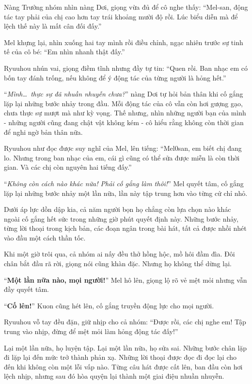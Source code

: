 \documentclass[../main.tex]{subfiles}
\begin{document}
Nàng Trưởng nhóm nhìn nàng Dơi, giọng vừa đủ để cô nghe thấy: ``Mel-san, động tác tay phải của chị cao hơn tay trái khoảng mười độ rồi. Lúc biểu diễn mà để lệch thế này là mất cân đối đấy.''

Mel khựng lại, nhìn xuống hai tay mình rồi điều chỉnh, ngạc nhiên trước sự tinh tế của cô bé: ``Em nhìn nhanh thật đấy.''

Ryuuhou nhún vai, giọng điềm tĩnh nhưng đầy tự tin: ``Quen rồi. Ban nhạc em có bốn tay đánh trống, nếu không để ý động tác của từng người là hỏng hết.''

``\textit{Mình\dots\ thực sự đã nhuần nhuyễn chưa?}'' nàng Dơi tự hỏi bản thân khi cố gắng lặp lại những bước nhảy trong đầu. Mỗi động tác của cô vẫn còn hơi gượng gạo, chưa thực sự mượt mà như kỳ vọng. Thế nhưng, nhìn những người bạn của mình - những người cũng đang chật vật không kém - cô hiểu rằng không còn thời gian để nghi ngờ bản thân nữa.

Ryuuhou như đọc được suy nghĩ của Mel, lên tiếng: ``Mel0san, em biết chị đang lo. Nhưng trong ban nhạc của em, cái gì cũng có thể sửa được miễn là còn thời gian. Và các chị còn nguyên hai tiếng đấy.''

``\textit{Không còn cách nào khác nữa! Phải cố gắng làm thôi!}'' Mel quyết tâm, cố gắng lặp lại những bước nhảy một lần nữa, lần này tập trung hơn vào từng cử chỉ nhỏ.

Dưới áp lực dồn dập kia, cả năm người bọn họ chẳng còn lựa chọn nào khác ngoài cố gắng hết sức trong những giờ phút quyết định này. Những bước nhảy, từng lời thoại trong kịch bản, các đoạn ngân trong bài hát, tất cả được nhồi nhét vào đầu một cách thần tốc.

Khi một giờ trôi qua, cả nhóm ai nấy đều thở hồng hộc, mồ hôi đầm đìa. Đôi chân bắt đầu rã rời, giọng nói cũng khàn đặc. Nhưng họ không thể dừng lại.

``\textbf{Một lần nữa nào, mọi người!}'' Mel hô lên, giọng lộ rõ vẻ mệt mỏi nhưng vẫn đầy quyết tâm.

``\textbf{Cố lên!}'' Kuon cũng hét lên, cố gắng truyền động lực cho mọi người.

Ryuuhou vỗ tay đều đặn, giữ nhịp cho cả nhóm: ``Được rồi, các chị nghe em! Tập trung vào nhịp, đừng để mệt mỏi làm hỏng động tác đấy!''

Lại một lần nữa, họ luyện tập. Lại một lần nữa, họ sửa sai. Những bước chân lặp đi lặp lại đến mức trở thành phản xạ. Những lời thoại được đọc đi đọc lại cho đến khi không còn một lỗi vấp nào. Từng câu hát được cất lên, ban đầu còn hơi lệch nhịp, nhưng sau đó hòa quyện lại thành một giai điệu nhuần nhuyễn.
\end{document}
